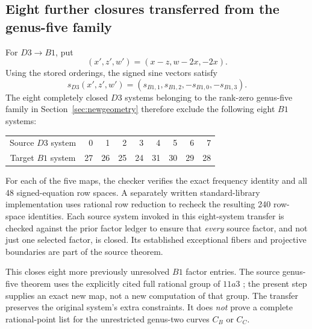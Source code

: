 \documentclass[11pt,letterpaper]{article}
\theoremstyle{definition}\newtheorem{definition}[theorem]{Definition}
\theoremstyle{remark}\newtheorem{remark}[theorem]{Remark}
\begin{document}
\subsection{Eight further closures transferred from the genus-five family}
For $D3\to B1$, put
\[
 (x',z',w')=(x-z,w-2x,-2x).
\]
Using the stored orderings, the signed sine vectors satisfy
\[
 s_{D3}(x',z',w')=(s_{B1,1},s_{B1,2},-s_{B1,0},-s_{B1,3}).
\]
The eight completely closed $D3$ systems belonging to the rank-zero genus-five family in Section~\ref{sec:newgeometry} therefore exclude the following eight $B1$ systems:
\begin{center}
\begin{tabular}{c|rrrrrrrr}
Source $D3$ system & 0&1&2&3&4&5&6&7\\
Target $B1$ system &27&26&25&24&31&30&29&28
\end{tabular}
\end{center}
For each of the five maps, the checker verifies the exact frequency identity and all 48 signed-equation row spaces. A separately written standard-library implementation uses rational row reduction to recheck the resulting 240 row-space identities. Each source system invoked in this eight-system transfer is checked against the prior factor ledger to ensure that \emph{every} source factor, and not just one selected factor, is closed. Its established exceptional fibers and projective boundaries are part of the source theorem.

This closes eight more previously unresolved $B1$ factor entries. The source genus-five theorem uses the explicitly cited full rational group of $11a3$ \cite{CremonaData}; the present step supplies an exact new map, not a new computation of that group. The transfer preserves the original system's extra constraints. It does \emph{not} prove a complete rational-point list for the unrestricted genus-two curves $C_B$ or $C_C$.
\end{document}
